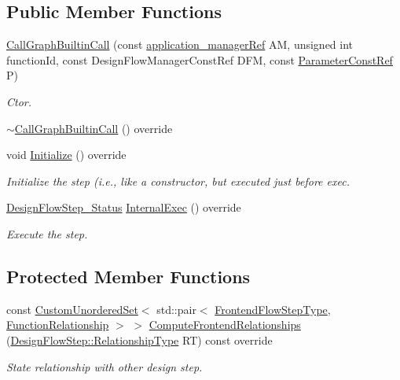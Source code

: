 \subsection*{Public Member Functions}
\begin{DoxyCompactItemize}
\item 
\hyperlink{classCallGraphBuiltinCall_a346a9538118b956780946e49400ba5da}{Call\+Graph\+Builtin\+Call} (const \hyperlink{application__manager_8hpp_a04ccad4e5ee401e8934306672082c180}{application\+\_\+manager\+Ref} AM, unsigned int function\+Id, const Design\+Flow\+Manager\+Const\+Ref D\+FM, const \hyperlink{Parameter_8hpp_a37841774a6fcb479b597fdf8955eb4ea}{Parameter\+Const\+Ref} P)
\begin{DoxyCompactList}\small\item\em Ctor. \end{DoxyCompactList}\item 
\hyperlink{classCallGraphBuiltinCall_a12b72c05a50fcdc40473638f0eae9087}{$\sim$\+Call\+Graph\+Builtin\+Call} () override
\item 
void \hyperlink{classCallGraphBuiltinCall_a8f754ae1d4aa2a9857d2288768902852}{Initialize} () override
\begin{DoxyCompactList}\small\item\em Initialize the step (i.\+e., like a constructor, but executed just before exec. \end{DoxyCompactList}\item 
\hyperlink{design__flow__step_8hpp_afb1f0d73069c26076b8d31dbc8ebecdf}{Design\+Flow\+Step\+\_\+\+Status} \hyperlink{classCallGraphBuiltinCall_a6c31ba7314cedc5026d47cb1c5b967ed}{Internal\+Exec} () override
\begin{DoxyCompactList}\small\item\em Execute the step. \end{DoxyCompactList}\end{DoxyCompactItemize}
\subsection*{Protected Member Functions}
\begin{DoxyCompactItemize}
\item 
const \hyperlink{classCustomUnorderedSet}{Custom\+Unordered\+Set}$<$ std\+::pair$<$ \hyperlink{frontend__flow__step_8hpp_afeb3716c693d2b2e4ed3e6d04c3b63bb}{Frontend\+Flow\+Step\+Type}, \hyperlink{classFrontendFlowStep_af7cf30f2023e5b99e637dc2058289ab0}{Function\+Relationship} $>$ $>$ \hyperlink{classCallGraphBuiltinCall_ac5ca8247365b5b574a96b17b86fcb57b}{Compute\+Frontend\+Relationships} (\hyperlink{classDesignFlowStep_a723a3baf19ff2ceb77bc13e099d0b1b7}{Design\+Flow\+Step\+::\+Relationship\+Type} RT) const override
\begin{DoxyCompactList}\small\item\em State relationship with other design step. \end{DoxyCompactList}\end{DoxyCompactItemize}
